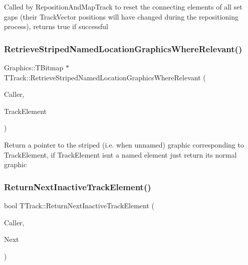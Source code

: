 Called by Reposition\+And\+Map\+Track to reset the connecting elements of all set gaps (their Track\+Vector positions will have changed during the repositioning process), returns true if successful \mbox{\label{class_t_track_a10027e5b78eb6dfdc246613d78aab53e}} 
\subsubsection{\texorpdfstring{Retrieve\+Striped\+Named\+Location\+Graphics\+Where\+Relevant()}{RetrieveStripedNamedLocationGraphicsWhereRelevant()}}
{\footnotesize\ttfamily Graphics\+::\+T\+Bitmap $\ast$ T\+Track\+::\+Retrieve\+Striped\+Named\+Location\+Graphics\+Where\+Relevant (\begin{DoxyParamCaption}\item[{int}]{Caller,  }\item[{\mbox{\hyperlink{class_t_track_element}{T\+Track\+Element}}}]{Track\+Element }\end{DoxyParamCaption})}

Return a pointer to the striped (i.\+e. when unnamed) graphic corresponding to Track\+Element, if Track\+Element isn\textquotesingle{}t a named element just return its normal graphic \mbox{\label{class_t_track_a58a2afacadd0f564b474ac0faabc88d4}} 
\subsubsection{\texorpdfstring{Return\+Next\+Inactive\+Track\+Element()}{ReturnNextInactiveTrackElement()}}
{\footnotesize\ttfamily bool T\+Track\+::\+Return\+Next\+Inactive\+Track\+Element (\begin{DoxyParamCaption}\item[{int}]{Caller,  }\item[{\mbox{\hyperlink{class_t_track_element}{T\+Track\+Element}} \&}]{Next }\end{DoxyParamCaption})}

